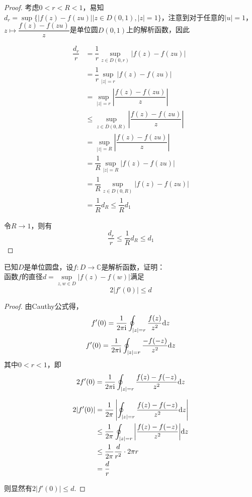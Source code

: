 \begin{proof}

    考虑$0 < r < R < 1$，易知$d_r = \sup\{|f(z) - f(zu)| \big| z \in D(0,1), |z| = 1 \}$，注意到对于任意的$|u| = 1$，$z \mapsto  \dfrac{f(z) - f(zu)}{z}$是单位圆$D(0,1)$上的解析函数，因此
    
    \begin{align*}
        \dfrac{d_r}{r} & = \dfrac{1}{r} \sup_{z \in D(0,r)}{|f(z) - f(zu)|} \\
        & = \dfrac{1}{r} \sup_{|z| = r}{|f(z) - f(zu)|} \\
        & = \sup_{|z| = r}{\left| \dfrac{f(z) - f(zu)}{z}\right|} \\
        & \leq \sup_{z \in \overline{D}(0,R)}{\left| \dfrac{f(z) - f(zu)}{z}\right|} \\
        & = \sup_{|z| = R}{\left| \dfrac{f(z) - f(zu)}{z}\right|} \\
        & = \dfrac{1}{R} \sup_{|z| = R}{|f(z) - f(zu)|} \\
        & = \dfrac{1}{R} \sup_{z \in D(0,R)}{|f(z) - f(zu)|} \\
        & = \dfrac{1}{R} d_{R} \leq \dfrac{1}{R} d_{1}
    \end{align*}

    令$R \to 1$，则有
    $$\dfrac{d_{r}}{r} \leq \dfrac{1}{R} d_{R} \leq d_1$$

\end{proof}

\begin{proposition}

    已知$D$是单位圆盘，设$f:D\to\mathbb{C}$是解析函数，证明：\\
    函数$f$的直径$d =\sup\limits_{z,w\in D}{|f(z) - f(w)|}$满足
    $$2|f'(0)| \leq d$$

\end{proposition}

\begin{proof}

    由\textup{Cauthy}公式得，
    $$f'(0) = \dfrac{1}{2\pi \mathrm{i}} \oint_{|z| = r}{\dfrac{f(z)}{z^2}}\mathrm{d} z$$
    $$f'(0) = \dfrac{1}{2\pi \mathrm{i}} \oint_{|z| = r}{\dfrac{-f(-z)}{z^2}}\mathrm{d} z$$
    其中$0 < r < 1$，即
    $$2f'(0) = \dfrac{1}{2\pi \mathrm{i}} \oint_{|z| = r}{\dfrac{f(z)-f(-z)}{z^2}}\mathrm{d} z$$

    \begin{align*}
        2|f'(0)| & = \dfrac{1}{2 \pi} \left| \oint_{|z| = r}{\dfrac{f(z)-f(-z)}{z^2}}\mathrm{d} z \right| \\
        & \leq \dfrac{1}{2 \pi} \oint_{|z|=r}{\left|\dfrac{f(z)-f(-z)}{z^2}\right|}\mathrm{d} z\\
        & \leq \dfrac{1}{2 \pi} \dfrac{d}{r^2} \cdot 2 \pi r\\
        & = \dfrac{d}{r}
    \end{align*}

    则显然有$2|f'(0)| \leq d$.

\end{proof}

